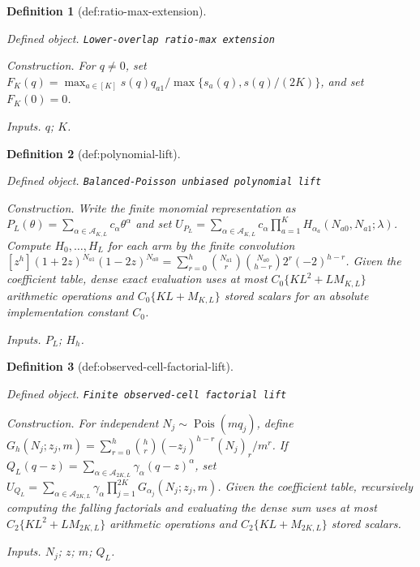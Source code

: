 \documentclass{article}
\newtheorem{definition}{Definition}
\begin{document}
\begin{definition}[def:ratio-max-extension]\label{def:ratio-max-extension}
\par\smallskip\noindent\emph{Defined object.} \texttt{Lower-\allowbreak{}overlap ratio-\allowbreak{}max extension}
\par\smallskip\noindent\emph{Construction.} For \(q\ne0\), set \(F_K(q)=\max_{a\in[K]}s(q)q_{a1}/\max\{s_a(q),s(q)/(2K)\}\), and set \(F_K(0)=0\).
\par\smallskip\noindent\emph{Inputs.} \(q\); \(K\).
\end{definition}

\begin{definition}[def:polynomial-lift]\label{def:polynomial-lift}
\par\smallskip\noindent\emph{Defined object.} \texttt{Balanced-\allowbreak{}Poisson unbiased polynomial lift}
\par\smallskip\noindent\emph{Construction.} Write the finite monomial representation as \(P_L(\theta)=\sum_{\alpha\in\mathcal A_{K,L}}c_\alpha\theta^\alpha\) and set \(U_{P_L}=\sum_{\alpha\in\mathcal A_{K,L}}c_\alpha\prod_{a=1}^K H_{\alpha_a}(N_{a0},N_{a1};\lambda)\). Compute \(H_0,\ldots,H_L\) for each arm by the finite convolution \([z^h](1+2z)^{N_{a1}}(1-2z)^{N_{a0}}=\sum_{r=0}^h\binom{N_{a1}}r\binom{N_{a0}}{h-r}2^r(-2)^{h-r}\). Given the coefficient table, dense exact evaluation uses at most \(C_0\{K L^2+L M_{K,L}\}\) arithmetic operations and \(C_0\{K L+M_{K,L}\}\) stored scalars for an absolute implementation constant \(C_0\).
\par\smallskip\noindent\emph{Inputs.} \(P_L\); \(H_h\).
\end{definition}

\begin{definition}[def:observed-cell-factorial-lift]\label{def:observed-cell-factorial-lift}
\par\smallskip\noindent\emph{Defined object.} \texttt{Finite observed-\allowbreak{}cell factorial lift}
\par\smallskip\noindent\emph{Construction.} For independent \(N_j\sim\operatorname{Pois}(m q_j)\), define \(G_h(N_j;z_j,m)=\sum_{r=0}^h\binom hr(-z_j)^{h-r}(N_j)_r/m^r\). If \(Q_L(q-z)=\sum_{\alpha\in\mathcal A_{2K,L}}\gamma_\alpha(q-z)^\alpha\), set \(U_{Q_L}=\sum_{\alpha\in\mathcal A_{2K,L}}\gamma_\alpha\prod_{j=1}^{2K}G_{\alpha_j}(N_j;z_j,m)\). Given the coefficient table, recursively computing the falling factorials and evaluating the dense sum uses at most \(C_2\{K L^2+L M_{2K,L}\}\) arithmetic operations and \(C_2\{K L+M_{2K,L}\}\) stored scalars.
\par\smallskip\noindent\emph{Inputs.} \(N_j\); \(z\); \(m\); \(Q_L\).
\end{definition}
\end{document}
